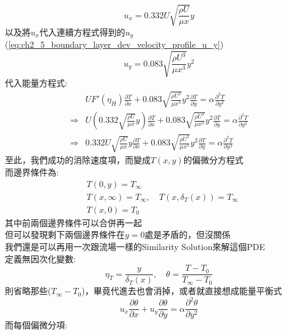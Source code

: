 \documentclass[../main.tex]{subfiles}
\begin{document}
\begin{itemize}
\begin{enumerate}
    \begin{equation}
      u_x = 0.332 U \sqrt{\frac{\rho U}{\mu x}} y
    \end{equation}
    以及將$u_x$代入連續方程式得到的$u_y$(\ref{eq:ch2_5_boundary_layer_dev_velocity_profile_u_y})
    \begin{equation}
      u_y = 0.083 \sqrt{\frac{\rho U^3}{\mu x^3}} y^2
    \end{equation}
    代入能量方程式:
    \begin{align}
      & U F'(\eta_H) \frac{\partial T}{\partial x} + 0.083 \sqrt{\frac{\rho U^3}{\mu x^3}} y^2 \frac{\partial T}{\partial y} = \alpha \frac{\partial^2 T}{\partial y^2} \nonumber\\
      \Rightarrow & U \left(
        0.332 \sqrt{\frac{\rho U}{\mu x}} y
      \right) \frac{\partial T}{\partial x} + 0.083 \sqrt{\frac{\rho U^3}{\mu x^3}} y^2 \frac{\partial T}{\partial y} = \alpha \frac{\partial^2 T}{\partial y^2} \nonumber\\
      \Rightarrow & 0.332 U \sqrt{\frac{\rho U}{\mu x}} y \frac{\partial T}{\partial x} + 0.083 \sqrt{\frac{\rho U^3}{\mu x^3}} y^2 \frac{\partial T}{\partial y} = \alpha \frac{\partial^2 T}{\partial y^2}
    \end{align}
    至此，我們成功的消除速度項，而變成$T(x,y)$的偏微分方程式\\
    而邊界條件為:
    \begin{align}
      &T(0,y) = T_\infty \nonumber\\
      &T(x,\infty) = T_\infty, \quad T(x,\delta_T(x))=T_\infty \nonumber\\
      &T(x,0) = T_0
    \end{align}
    其中前兩個邊界條件可以合併再一起\\
    但可以發現剩下兩個邊界條件在$y=0$處是矛盾的，但沒關係\\
    我們還是可以再用一次跟流場一樣的Similarity Solution來解這個PDE\\
    定義無因次化變數:
    \begin{equation}
      \eta_T =\frac{y}{\delta_T(x)}, \quad \theta = \frac{T - T_0}{T_\infty - T_0}
    \end{equation}
    則省略那些($T_\infty - T_0$)，畢竟代進去也會消掉，或者就直接想成能量平衡式
    \begin{equation}
      u_x \frac{\partial \theta}{\partial x} + u_y \frac{\partial \theta}{\partial y} = \alpha \frac{\partial^2 \theta}{\partial y^2}
    \end{equation}
    而每個偏微分項:
    \begin{align}

\end{align}
\end{enumerate}
\end{itemize}
\end{document}
